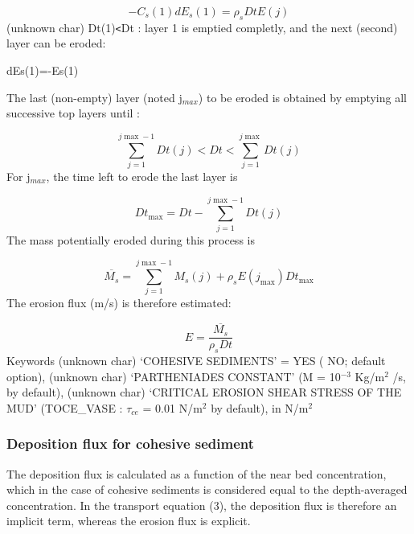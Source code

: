 \begin{equation*}
-C_{s} (1)dE_{s} (1)=\rho _{s} DtE\left( j\right) 
\end{equation*}%
(unknown char)\hspace{5mm} Dt(1)\texttt{<}Dt : layer 1 is emptied completly,
and the next (second) layer can be eroded:

dEs(1)=-Es(1)

The last (non-empty) layer (noted j$_{max}$) to be eroded is obtained by
emptying all successive top layers until :

\begin{equation*}
\sum\limits_{j=1}^{j\max -1} Dt(j)<Dt<\sum\limits_{j=1}^{j\max } Dt(j) 
\end{equation*}
For j$_{max}$, the time left to erode the last layer is

\begin{equation*}
Dt_{\max } =Dt-\sum\limits_{j=1}^{j\max -1} Dt(j) 
\end{equation*}%
The mass potentially eroded during this process is

\begin{equation*}
\overline{M_{s} } =\sum\limits_{j=1}^{j\max -1}M_{s} (j) +\rho _{s}
E(j_{\max } )Dt_{\max } 
\end{equation*}%
The erosion flux (m/s) is therefore estimated{\nobreakspace}: \hspace{5mm}

\begin{equation*}
E=\frac{\overline{M_{s} } }{\rho _{s} Dt} 
\end{equation*}
Keywords\newline
(unknown char)\hspace{5mm} `COHESIVE SEDIMENTS' = YES ( NO; default option),%
\newline
(unknown char)\hspace{5mm} `PARTHENIADES CONSTANT' (M = 10$^{-3}$ Kg/m$^{2}$%
/s, by default),\newline
(unknown char)\hspace{5mm} `CRITICAL EROSION SHEAR STRESS OF THE MUD'
(TOCE\_VASE : $\tau$$_{ce}$ = 0.01 N/m$^{2}$ by default), in N/m$^{2}$

\subsubsection{Deposition flux for cohesive sediment}

The deposition flux is calculated as a function of the near bed
concentration, which in the case of cohesive sediments is considered equal
to the depth-averaged concentration. In the transport equation (3), the
deposition flux is therefore an implicit term, whereas the erosion flux is
explicit.


